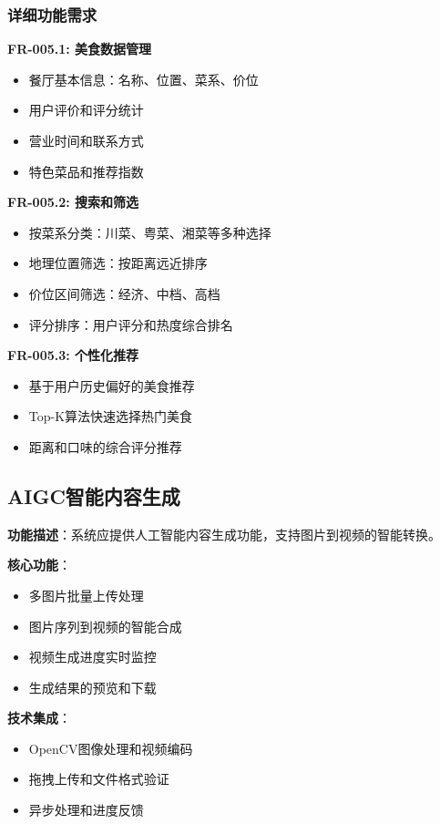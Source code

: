 \documentclass[12pt,a4paper]{article}
\begin{document}
\subsubsection{详细功能需求}

\textbf{FR-005.1: 美食数据管理}
\begin{itemize}
    \item 餐厅基本信息：名称、位置、菜系、价位
    \item 用户评价和评分统计
    \item 营业时间和联系方式
    \item 特色菜品和推荐指数
\end{itemize}

\textbf{FR-005.2: 搜索和筛选}
\begin{itemize}
    \item 按菜系分类：川菜、粤菜、湘菜等多种选择
    \item 地理位置筛选：按距离远近排序
    \item 价位区间筛选：经济、中档、高档
    \item 评分排序：用户评分和热度综合排名
\end{itemize}

\textbf{FR-005.3: 个性化推荐}
\begin{itemize}
    \item 基于用户历史偏好的美食推荐
    \item Top-K算法快速选择热门美食
    \item 距离和口味的综合评分推荐
\end{itemize}

\subsection{AIGC智能内容生成}

\begin{reqbox}[title={FR-006: AIGC智能生成}]
\textbf{功能描述}：系统应提供人工智能内容生成功能，支持图片到视频的智能转换。

\textbf{核心功能}：
\begin{itemize}[nosep]
    \item 多图片批量上传处理
    \item 图片序列到视频的智能合成
    \item 视频生成进度实时监控
    \item 生成结果的预览和下载
\end{itemize}

\textbf{技术集成}：
\begin{itemize}[nosep]
    \item OpenCV图像处理和视频编码
    \item 拖拽上传和文件格式验证
    \item 异步处理和进度反馈
\end{itemize}
\end{reqbox}
\end{document}
